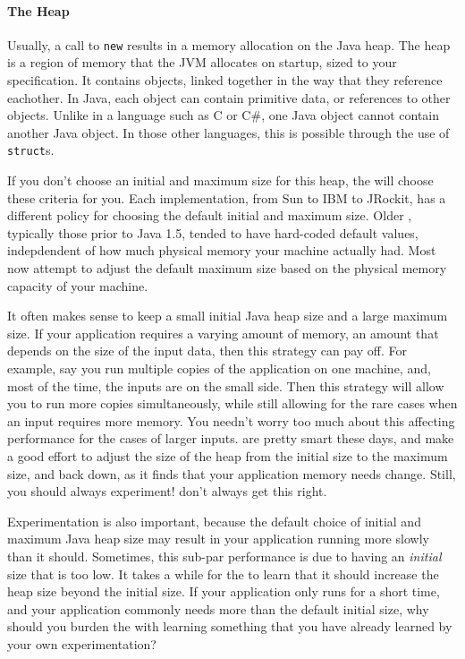 
\paragraph{The Heap}
Usually, a call to {\tt new} results in a memory allocation on the Java heap.
The heap is a region of memory that the JVM allocates on startup, sized to your
specification. It contains objects, linked together in the way that they
reference eachother. In Java, each object can contain primitive data, or
references to other objects. Unlike in a language such as C or C\#, one Java
object cannot contain another Java object.  In those other languages, this is
possible through the use of {\tt struct}s.

If you don't choose an initial and maximum size for this
heap, the \jre will choose these criteria for you. Each \jre implementation,
from Sun to IBM to JRockit, has a different policy for choosing the default
initial and maximum size. Older \jres, typically those prior to Java 1.5, tended
to have hard-coded default values, indepdendent of how much physical memory your
machine actually had. Most \jres now attempt to adjust the default
maximum size based on the physical memory capacity of your machine. 

It often makes sense to keep a small initial Java heap size and a large maximum
size.  If your application requires a varying amount of memory, an amount that
depends on the size of the input data, then this strategy can pay off. For
example, say you run multiple copies of the application on one machine, and,
most of the time, the inputs are on the small side. Then this strategy will
allow you to run more copies simultaneously, while still allowing for the rare
cases when an input requires more memory. You needn't worry too much about this
affecting performance for the cases of larger inputs. \jres are pretty smart
these days, and make a good effort to adjust the size of the heap from the
initial size to the maximum size, and back down, as it finds that your
application memory needs change. Still, you should always experiment! \jres
don't always get this right.

Experimentation is also important, because the default choice of initial and
maximum Java heap size may result in your application running more slowly than
it should. Sometimes, this sub-par performance is due to having an
\emph{initial} size that is too low. It takes a while for the \jre to learn that
it should increase the heap size beyond the initial size. If your application
only runs for a short time, and your application commonly needs more than the
default initial size, why should you burden the \jre with learning something
that you have already learned by your own experimentation?

